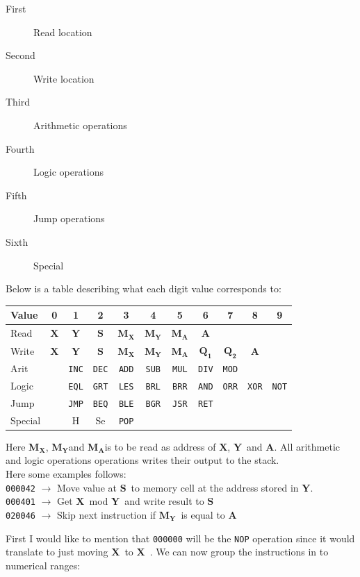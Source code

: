 \documentclass{article}
\newcommand{\V}{\verb}
\newcommand{\x}{$\textbf{X}$}
\newcommand{\y}{$\textbf{Y}$}
\newcommand{\s}{$\textbf{S}$}
\newcommand{\A}{$\textbf{A}$}
\newcommand{\mx}{$\textbf{M}_{\textbf{X}}$}
\newcommand{\my}{$\textbf{M}_{\textbf{Y}}$}
\newcommand{\ma}{$\textbf{M}_{\textbf{A}}$}
\newcommand{\q}{$\textbf{Q}_{\textbf{1}}$}
\newcommand{\qq}{$\textbf{Q}_{\textbf{2}}$}
\begin{document}
\begin{description}
  \item[First] Read location
  \item[Second] Write location
  \item[Third] Arithmetic operations
  \item[Fourth] Logic operations
  \item[Fifth] Jump operations
  \item[Sixth] Special
\end{description}
Below is a table describing what each digit value corresponds to:
\begin{center}
\begin{tabular}{l || *{10}{c |}}
Value & 0 & 1 & 2 & 3 & 4 & 5 & 6 & 7 & 8 & 9 \\
\hline
Read & \x & \y & \s  &\mx & \my & \ma & \A & & & \\

Write & \x & \y & \s  &\mx & \my & \ma & \q& \qq & \A &\\

Arit &  & \V+INC+ & \V+DEC+ & \V+ADD+ & \V+SUB+ & \V+MUL+ & \V+DIV+ & \V+MOD+  & 
&
\\

Logic &  &  \V+EQL+ & \V+GRT+ & \V+LES+ & \V+BRL+ & \V+BRR+ & \V+AND+ & \V+ORR+
& \V+XOR+ & \V+NOT+\\

Jump & & \V+JMP+ & \V+BEQ+ & \V+BLE+ & \V+BGR+ & \V+JSR+ & \V+RET+ & & & \\

Special & & H & Se & \V+POP+ &  &  &  &  &  &  \\	
\end{tabular}
\end{center}
Here \mx , \my and \ma is to be read as address of \x , \y \ and \A.  All
arithmetic and logic operations operations writes their output to the stack.\\
Here some examples follows:\\
\verb+000042+ $\rightarrow$ Move value at \s \ to memory cell at the address
stored in \y. \\
\verb+000401+ $\rightarrow$ Get \x \ mod \y \ and write result to \s \\
\verb+020046+ $\rightarrow$ Skip next instruction if \my \ is equal to \A \\
\newpage

First I would like to  mention that
\verb+000000+ will be the \verb+NOP+ operation since it would translate to just
moving \x \ to \x \ . 
We can now group the instructions in to numerical ranges:
\end{document}
